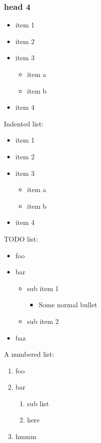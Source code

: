 \subsubsection{head 4}



\begin{itemize}
\item item 1
\item item 2
\item item 3
\begin{itemize}
	\item item a
	\item item b
\end{itemize}\item item 4
\end{itemize}



Indented list:

\begin{itemize}
\item item 1
\item item 2
\item item 3
\begin{itemize}
	\item item a
	\item item b
\end{itemize}\item item 4
\end{itemize}



TODO list:

\begin{itemize}
\item[\Square] foo
\item[\CheckedBox] bar
\begin{itemize}
	\item[\CheckedBox] sub item 1
\begin{itemize}
		\item Some normal bullet
\end{itemize}	\item[\CheckedBox] sub item 2
\end{itemize}\item[\XBox] baz
\end{itemize}



A numbered list:

\begin{enumerate}[1]
\item foo
\item bar
\begin{enumerate}[a]
	\item sub list
	\item here
\end{enumerate}\item hmmm
\end{enumerate}



